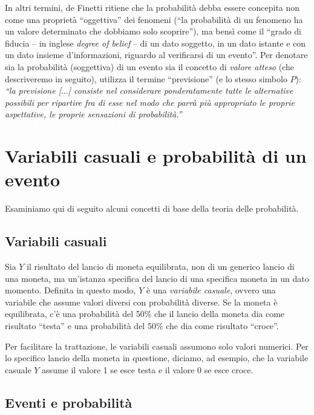\documentclass[
  11pt,
]{krantz}
\theoremstyle{definition}
\theoremstyle{definition}
\theoremstyle{definition}
\theoremstyle{definition}
\theoremstyle{remark}
\begin{document}
In altri termini, de Finetti ritiene che la probabilità debba essere concepita non come una proprietà ``oggettiva'' dei fenomeni (``la probabilità di un fenomeno ha un valore determinato che dobbiamo solo scoprire''), ma bensì come il ``grado di fiducia -- in inglese \emph{degree of belief} -- di un dato soggetto, in un dato istante e con un dato insieme d'informazioni, riguardo al verificarsi di un evento''. Per denotare sia la probabilità (soggettiva) di un evento sia il concetto di \emph{valore atteso} (che descriveremo in seguito), \citet{definetti1970teoria} utilizza il termine ``previsione'' (e lo stesso simbolo \(P\)): \emph{``la previsione {[}\(\dots\){]} consiste nel considerare ponderatamente tutte le alternative possibili per ripartire fra di esse nel modo che parrà più appropriato le proprie aspettative, le proprie sensazioni di probabilità.''}

\hypertarget{variabili-casuali-e-probabilituxe0-di-un-evento}{%
\section{Variabili casuali e probabilità di un evento}\label{variabili-casuali-e-probabilituxe0-di-un-evento}}

Esaminiamo qui di seguito alcuni concetti di base della teoria delle probabilità.

\hypertarget{variabili-casuali}{%
\subsection{Variabili casuali}\label{variabili-casuali}}

Sia \(Y\) il risultato del lancio di moneta equilibrata, non di un generico lancio di una moneta, ma un'istanza specifica del lancio di una specifica moneta in un dato momento. Definita in questo modo, \(Y\) è una \emph{variabile casuale}, ovvero una variabile che assume valori diversi con probabilità diverse. Se la moneta è equilibrata, c'è una probabilità del 50\% che il lancio della moneta dia come risultato ``testa'' e una probabilità del 50\% che dia come risultato ``croce''.

Per facilitare la trattazione, le variabili casuali assumono solo valori numerici. Per lo specifico lancio della moneta in questione, diciamo, ad esempio, che la variabile casuale \(Y\) assume il valore 1 se esce testa e il valore 0 se esce croce.

\hypertarget{eventi-e-probabilituxe0}{%
\subsection{Eventi e probabilità}\label{eventi-e-probabilituxe0}}
\end{document}
